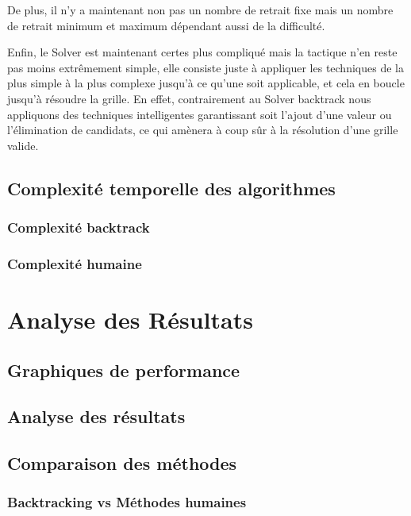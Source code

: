 \documentclass[a4paper]{article}
\begin{document}
De plus, il n'y a maintenant non pas un nombre de retrait fixe mais un nombre de retrait minimum et maximum dépendant aussi de la difficulté.

Enfin, le Solver est maintenant certes plus compliqué mais la tactique n'en reste pas moins extrêmement simple, elle consiste juste à appliquer les techniques de la plus simple à la plus complexe jusqu'à ce qu'une soit applicable, et cela en boucle jusqu'à résoudre la grille. En effet, contrairement au Solver backtrack nous appliquons des techniques intelligentes garantissant soit l'ajout d'une valeur ou l'élimination de candidats, ce qui amènera à coup sûr à la résolution d'une grille valide.

\subsection{Complexité temporelle des algorithmes}

\subsubsection{Complexité backtrack}

\subsubsection{Complexité humaine}

\vspace{0.5cm}

\section{Analyse des Résultats}

\subsection{Graphiques de performance}

\subsection{Analyse des résultats}

\subsection{Comparaison des méthodes}

\subsubsection{Backtracking vs Méthodes humaines}
\end{document}
